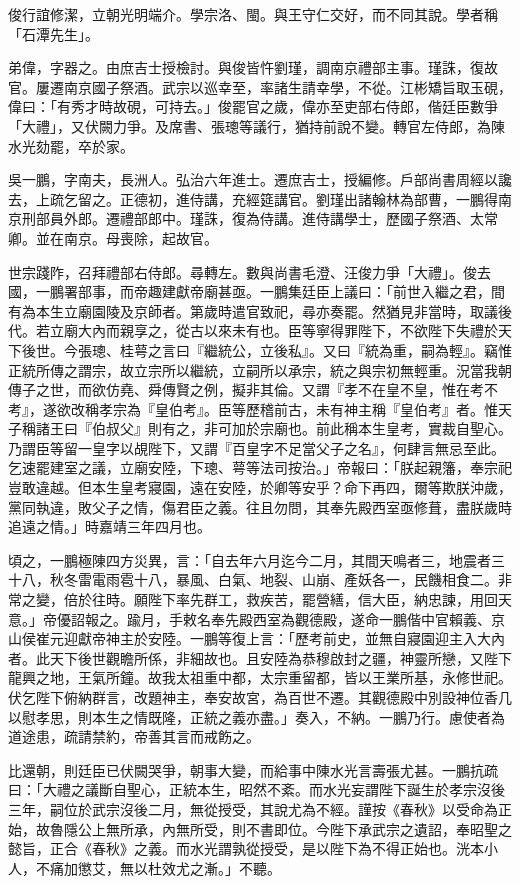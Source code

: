 \begin{pinyinscope}
俊行誼修潔，立朝光明端介。學宗洛、閩。與王守仁交好，而不同其說。學者稱「石潭先生」。

弟偉，字器之。由庶吉士授檢討。與俊皆忤劉瑾，調南京禮部主事。瑾誅，復故官。屢遷南京國子祭酒。武宗以巡幸至，率諸生請幸學，不從。江彬矯旨取玉硯，偉曰：「有秀才時故硯，可持去。」俊罷官之歲，偉亦至吏部右侍郎，偕廷臣數爭「大禮」，又伏闕力爭。及席書、張璁等議行，猶持前說不變。轉官左侍郎，為陳水光劾罷，卒於家。

吳一鵬，字南夫，長洲人。弘治六年進士。遷庶吉士，授編修。戶部尚書周經以讒去，上疏乞留之。正德初，進侍講，充經筵講官。劉瑾出諸翰林為部曹，一鵬得南京刑部員外郎。遷禮部郎中。瑾誅，復為侍講。進侍講學士，歷國子祭酒、太常卿。並在南京。母喪除，起故官。

世宗踐阼，召拜禮部右侍郎。尋轉左。數與尚書毛澄、汪俊力爭「大禮」。俊去國，一鵬署部事，而帝趣建獻帝廟甚亟。一鵬集廷臣上議曰：「前世入繼之君，間有為本生立廟園陵及京師者。第歲時遣官致祀，尋亦奏罷。然猶見非當時，取議後代。若立廟大內而親享之，從古以來未有也。臣等寧得罪陛下，不欲陛下失禮於天下後世。今張璁、桂萼之言曰『繼統公，立後私』。又曰『統為重，嗣為輕』。竊惟正統所傳之謂宗，故立宗所以繼統，立嗣所以承宗，統之與宗初無輕重。況當我朝傳子之世，而欲仿堯、舜傳賢之例，擬非其倫。又謂『孝不在皇不皇，惟在考不考』，遂欲改稱孝宗為『皇伯考』。臣等歷稽前古，未有神主稱『皇伯考』者。惟天子稱諸王曰『伯叔父』則有之，非可加於宗廟也。前此稱本生皇考，實裁自聖心。乃謂臣等留一皇字以覘陛下，又謂『百皇字不足當父子之名』，何肆言無忌至此。乞速罷建室之議，立廟安陸，下璁、萼等法司按治。」帝報曰：「朕起親籓，奉宗祀豈敢違越。但本生皇考寢園，遠在安陸，於卿等安乎？命下再四，爾等欺朕沖歲，黨同執違，敗父子之情，傷君臣之義。往且勿問，其奉先殿西室亟修葺，盡朕歲時追遠之情。」時嘉靖三年四月也。

頃之，一鵬極陳四方災異，言：「自去年六月迄今二月，其間天鳴者三，地震者三十八，秋冬雷電雨雹十八，暴風、白氣、地裂、山崩、產妖各一，民饑相食二。非常之變，倍於往時。願陛下率先群工，救疾苦，罷營繕，信大臣，納忠諫，用回天意。」帝優詔報之。踰月，手敕名奉先殿西室為觀德殿，遂命一鵬偕中官賴義、京山侯崔元迎獻帝神主於安陸。一鵬等復上言：「歷考前史，並無自寢園迎主入大內者。此天下後世觀瞻所係，非細故也。且安陸為恭穆啟封之疆，神靈所戀，又陛下龍興之地，王氣所鐘。故我太祖重中都，太宗重留都，皆以王業所基，永修世祀。伏乞陛下俯納群言，改題神主，奉安故宮，為百世不遷。其觀德殿中別設神位香几以慰孝思，則本生之情既隆，正統之義亦盡。」奏入，不納。一鵬乃行。慮使者為道途患，疏請禁約，帝善其言而戒飭之。

比還朝，則廷臣已伏闕哭爭，朝事大變，而給事中陳水光言壽張尤甚。一鵬抗疏曰：「大禮之議斷自聖心，正統本生，昭然不紊。而水光妄謂陛下誕生於孝宗沒後三年，嗣位於武宗沒後二月，無從授受，其說尤為不經。謹按《春秋》以受命為正始，故魯隱公上無所承，內無所受，則不書即位。今陛下承武宗之遺詔，奉昭聖之懿旨，正合《春秋》之義。而水光謂孰從授受，是以陛下為不得正始也。洸本小人，不痛加懲艾，無以杜效尤之漸。」不聽。


\end{pinyinscope}
